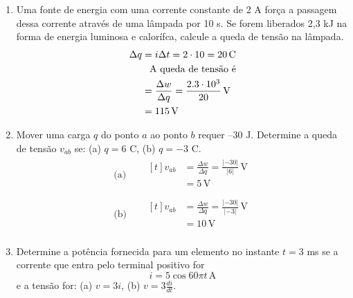 \begin{enumerate}
	\item Uma fonte de energia com uma corrente constante de 2 A força a passagem
	      dessa corrente através de uma lâmpada por 10 s. Se forem liberados 2,3 kJ
	      na forma de energia luminosa e calorífca, calcule a queda de tensão na
	      lâmpada.
	      \[
		      \begin{aligned}
			      \Delta q & = i \Delta t = 2 \cdot 10 = 20 \,\text{C}                          \\
			               & \hphantom{=} \text{A queda de tensão é}                            \\
			               & = \frac{\Delta w}{\Delta q} = \frac{2.3 \cdot 10^3}{20} \,\text{V} \\
			               & = 115 \,\text{V}                                                   \\
		      \end{aligned}
	      \]
	\item Mover uma carga \( q \) do ponto \( a \) ao ponto \( b \) requer –30
	      J. Determine a queda de tensão \( v_{ab} \) se: (a) \( q = 6 \) C, (b)
	      \( q = -3 \) C.
	      \begin{align*}
		      \text{(a)}\quad &
		      \begin{aligned}[t]
			      v_{ab} & = \frac{\Delta w}{\Delta q} = \frac{\lvert-30\rvert}{\lvert6\rvert} \,\text{V} \\
			             & = 5 \,\text{V}                                                                 \\
		      \end{aligned}
		      \\
		      \text{(b)}\quad &
		      \begin{aligned}[t]
			      v_{ab} & = \frac{\Delta w}{\Delta q} = \frac{\lvert-30\rvert}{\lvert-3\rvert} \,\text{V} \\
			             & = 10 \,\text{V}                                                                 \\
		      \end{aligned}
	      \end{align*}
	\item Determine a potência fornecida para um elemento no instante \( t =
	      3\) ms se a corrente que entra pelo terminal positivo for
	      \[
		      i = 5 \cos{60} \pi t \, \text{A}
	      \]
	      e a tensão for: (a) \( v = 3i \), (b) \( v = 3\frac{di}{dt} \).
	      \begin{align*}

\end{align*}
\end{enumerate}
